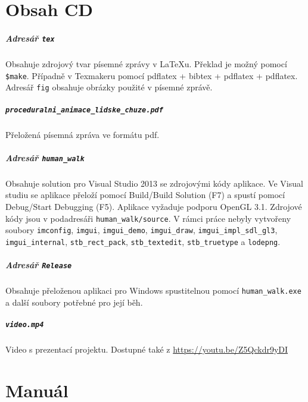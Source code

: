 \chapter{Obsah CD}
\paragraph{Adresář \texttt{tex}}
Obsahuje zdrojový tvar písemné zprávy v \LaTeX u. Překlad je možný pomocí \texttt{\$make}. Případně v Texmakeru pomocí pdflatex + bibtex + pdflatex + pdflatex. Adresář \texttt{fig} obsahuje obrázky použité v písemné zprávě.

\paragraph{\texttt{proceduralni\_animace\_lidske\_chuze.pdf}}
Přeložená písemná zpráva ve formátu pdf.

\paragraph{Adresář \texttt{human\_walk}}
Obsahuje solution pro Visual Studio 2013 se zdrojovými kódy aplikace. Ve Visual studiu se aplikace přeloží pomocí Build/Build Solution (F7) a spustí pomocí Debug/Start Debugging (F5). Aplikace vyžaduje podporu OpenGL 3.1. Zdrojové kódy jsou v podadresáři \texttt{human\_walk/source}. V rámci práce nebyly vytvořeny soubory \texttt{imconfig}, \texttt{imgui}, \texttt{imgui\_demo}, \texttt{imgui\_draw}, \texttt{imgui\_impl\_sdl\_gl3}, \texttt{imgui\_internal}, \texttt{stb\_rect\_pack}, \texttt{stb\_textedit}, \texttt{stb\_truetype} a \texttt{lodepng}.

\paragraph{Adresář \texttt{Release}}
Obsahuje přeloženou aplikaci pro Windows spustitelnou pomocí \texttt{human\_walk.exe} a další soubory potřebné pro její běh.

\paragraph{\texttt{video.mp4}}
Video s prezentací projektu. Dostupné také z \url{https://youtu.be/Z5Qckdr9yDI}

\chapter{Manuál}

